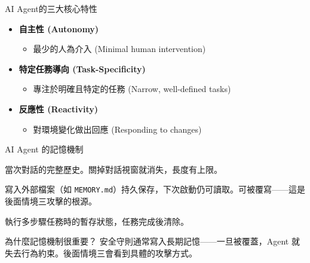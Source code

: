 \documentclass[aspectratio=1610]{Common/MyCourseBeamer}
\begin{document}
\begin{frame}{AI Agent的三大核心特性}
    \begin{itemize}
        \setlength{\itemsep}{1em} %
        \item \textbf{自主性 (Autonomy)}
        \begin{itemize}
            \item 最少的人為介入 (Minimal human intervention)
        \end{itemize}
        
        \item \textbf{特定任務導向 (Task-Specificity)}
        \begin{itemize}
            \item 專注於明確且特定的任務 (Narrow, well-defined tasks)
        \end{itemize}
        
        \item \textbf{反應性 (Reactivity)}
        \begin{itemize}
            \item 對環境變化做出回應 (Responding to changes)
        \end{itemize}
    \end{itemize}
\end{frame}



\begin{frame}{AI Agent 的記憶機制}

	\begin{description}
		\item[\textbf{短期記憶（Context Window）}] 當次對話的完整歷史。關掉對話視窗就消失，長度有上限。
		\item[\textbf{長期記憶（外部記憶檔）}] 寫入外部檔案（如 \texttt{MEMORY.md}）持久保存，下次啟動仍可讀取。\alert{可被覆寫——這是後面情境三攻擊的根源。}
		\item[\textbf{工作記憶（中間步驟）}] 執行多步驟任務時的暫存狀態，任務完成後清除。
	\end{description}

	\vspace{0.4em}
	\begin{block}{為什麼記憶機制很重要？}
		安全守則通常寫入長期記憶——一旦被覆蓋，Agent 就失去行為約束。後面情境三會看到具體的攻擊方式。
	\end{block}

\end{frame}
\end{document}
